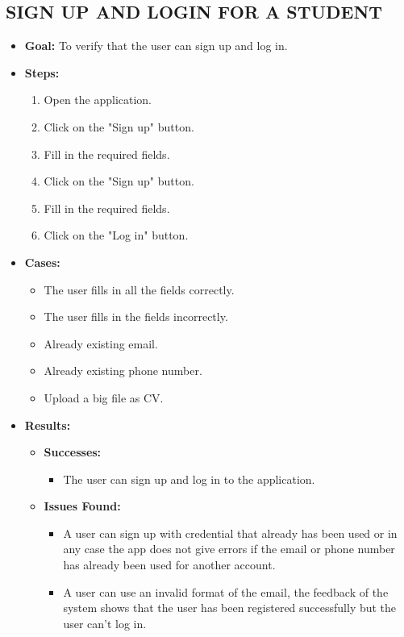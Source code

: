\subsection{SIGN UP AND LOGIN FOR A STUDENT}\label{subsec:sign-up-and-login-for-a-student}
\begin{itemize}
    \item \textbf{Goal:} To verify that the user can sign up and log in.

    \item \textbf{Steps:}
    \begin{enumerate}
        \item Open the application.
        \item Click on the "Sign up" button.
        \item Fill in the required fields.
        \item Click on the "Sign up" button.
        \item  Fill in the required fields.
        \item Click on the "Log in" button.
    \end{enumerate}
    \item \textbf{Cases:}
    \begin{itemize}
        \item The user fills in all the fields correctly.
        \item The user fills in the fields incorrectly.
        \item Already existing email.
        \item Already existing phone number.
        \item Upload a big file as CV.
    \end{itemize}
    \item \textbf{Results:}
    \begin{itemize}
        \item \textbf{Successes:}
        \begin{itemize}
            \item The user can sign up and log in to the application.
        \end{itemize}
        \item \textbf{Issues Found:}
        \begin{itemize}
            \item A user can sign up with credential that already has been used or in any case the app does not give errors if the email or phone number has already been used for another account.
            \item A user can use an invalid format of the email, the feedback of the system shows that the user has been registered successfully but the user can't log in.
        \end{itemize}
    \end{itemize}
\end{itemize}

